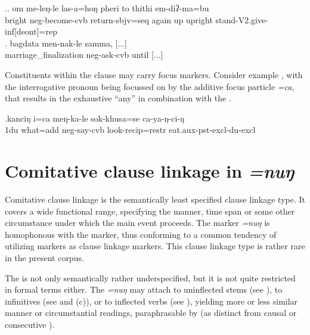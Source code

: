 \ex.\ag. om   me-leŋ-le  las-a=hoŋ  pheri to  thithi    em-diʔ-ma=bu\\
bright {\sc neg}-become-{\sc cvb} return{\sc [3sg]-sbjv=seq} again up upright stand{\sc -V2.give-inf[deont]=rep}\\
 
\bg. bagdata  men-nak-le    samma, [...]\\
marriage\_finalization {\sc neg}-ask-{\sc cvb}  until [...]\\
 


Constituents within the clause may carry focus markers. Consider example \Next, with the interrogative pronoun being focussed on by the additive focus particle \emph{=ca}, that results in the exhaustive  “any” in combination with the . 

\exg.kanciŋ i=ca meŋ-ka-le sok-khusa=se ca-ya-ŋ-ci-ŋ\\
{\sc 1du} what{\sc =add} {\sc neg}-say-{\sc cvb} look{\sc -recip=restr} eat.{\sc aux-pst-excl-du-excl}\\
 


\section{Comitative clause linkage in \emph{=nuŋ}}\label{com-cl}

Comitative clause linkage is the semantically least specified  clause linkage type. It covers a wide functional range, specifying the  manner, time span  or some other circumstance under which the main event proceeds. The marker \emph{=nuŋ} is homophonous with the   marker, thus conforming to a common  tendency of utilizing  markers as clause linkage markers. This clause linkage type is rather rare in the present corpus.

The  is not only semantically rather underspecified, but it is not quite restricted in formal terms either. The  \emph{=nuŋ} may attach to uninflected stems (see \Next[a]), to infinitives (see \Next[b] and (c)), or to inflected verbs (see \Next[d]), yielding more or less similar manner or circumstantial readings, paraphrasable by  (as distinct from causal or consecutive ). 

